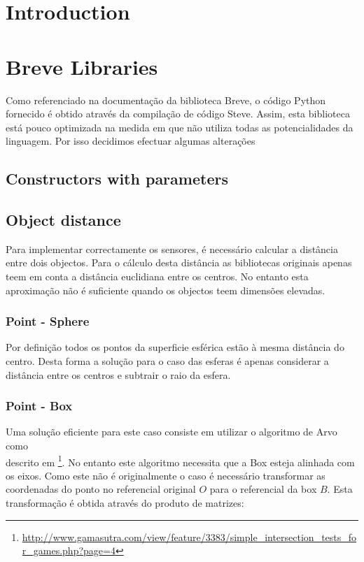 \documentclass[a4paper]{article}
\title{\documentTitle}
\author{\documentAuthors{}}
\begin{document}
\maketitle
\cleardoublepage

\tableofcontents
\cleardoublepage

\setlength{\parindent}{1cm}
\setlength{\parskip}{0.3cm}

\section{Introduction}

\cleardoublepage
\section{Breve Libraries}
Como referenciado na documentação da biblioteca Breve, o código Python fornecido é obtido através da compilação de código Steve.
Assim, esta biblioteca está pouco optimizada na medida em que não utiliza todas as potencialidades da linguagem. 
Por isso decidimos efectuar algumas alterações

\subsection{Constructors with parameters}

\subsection{Object distance}
\indent \indent Para implementar correctamente os sensores, é necessário calcular a distância entre dois objectos.
Para o cálculo desta distância as bibliotecas originais apenas teem em conta a distância euclidiana entre os centros.
No entanto esta aproximação não é suficiente quando os objectos teem dimensões elevadas.

\subsubsection{Point - Sphere}
\indent \indent Por definição todos os pontos da superficie esférica estão à mesma distância do centro.
Desta forma a solução para o caso das esferas é apenas considerar a distância entre os centros e subtrair o raio da esfera.

\subsubsection{Point - Box}
\indent \indent Uma solução eficiente para este caso consiste em utilizar o algoritmo de Arvo como \\ descrito em  \footnote[1]{\url{http://www.gamasutra.com/view/feature/3383/simple_intersection_tests_for_games.php?page=4}}.
No entanto este algoritmo necessita que a Box esteja alinhada com os eixos.
Como este não é originalmente o caso é necessário transformar as coordenadas do ponto no referencial original $O$ para o referencial da box $B$.
Esta transformação é obtida através do produto de matrizes:
\end{document}
